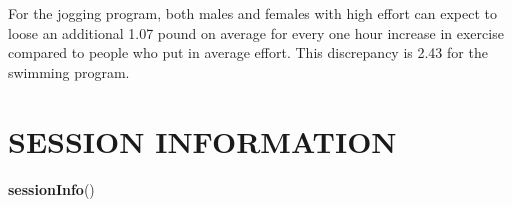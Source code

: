 \documentclass[
]{article}
\newenvironment{Shaded}{\begin{snugshade}}{\end{snugshade}}
\newcommand{\FunctionTok}[1]{\textcolor[rgb]{0.13,0.29,0.53}{\textbf{#1}}}
\newcommand{\NormalTok}[1]{#1}
\begin{document}
For the jogging program, both males and females with high effort can
expect to loose an additional 1.07 pound on average for every one hour
increase in exercise compared to people who put in average effort. This
discrepancy is 2.43 for the swimming program.

\clearpage

\hypertarget{session-information}{%
\section{SESSION INFORMATION}\label{session-information}}

\begin{Shaded}
\begin{Highlighting}[]
\FunctionTok{sessionInfo}\NormalTok{()}
\end{Highlighting}
\end{Shaded}
\end{document}
